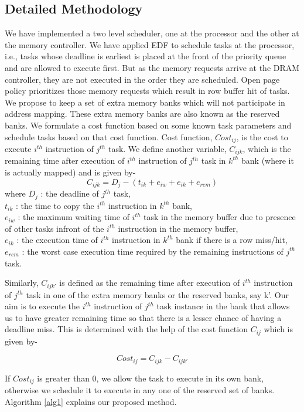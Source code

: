 \subsection{Detailed Methodology}
\noindent
We have implemented a two level scheduler, one at the processor and the other at the memory controller. We have applied EDF to 
schedule tasks at the processor, i.e., tasks whose deadline is earliest is placed at the front of the priority queue and are 
allowed to execute first. But as the memory requests arrive at the DRAM controller, they are not executed in the order 
they are scheduled. Open page policy prioritizes those memory requests which result in row buffer hit of tasks. We propose 
to keep a set of extra memory banks which will not participate in address mapping. These extra memory banks are also known as
the reserved banks. We formulate a cost function based on some
known task parameters and schedule tasks based on that cost function. Cost function, $Cost_{ij}$, is the cost to execute 
$i^{th}$ instruction of $j^{th}$ task. We define another variable, $C_{ijk}$, which is the remaining time after execution
of $i^{th}$ instruction of $j^{th}$ task in $k^{th}$ bank (where it is actually mapped) and is given by-
\[C_{ijk} = D_{j} - (t_{ik} + e_{iw} + e_{ik} + e_{rem})\]\label{eq1}
where $D_{j}$ : the deadline of $j^{th}$ task,\\
$t_{ik}$ : the time to copy the $i^{th}$ instruction in $k^{th}$ bank,\\
$e_{iw}$ : the maximum waiting time of $i^{th}$ task in the memory buffer due to presence of other tasks infront of the 
$i^{th}$ instruction in the memory buffer,\\
$e_{ik}$ : the execution time of $i^{th}$ instruction in $k^{th}$ bank if there is a row miss/hit,\\
$e_{rem}$ : the worst case execution time required by the remaining instructions of $j^{th}$ task.

Similarly, $C_{ijk'}$ is defined as the remaining time after execution of $i^{th}$ instruction of $j^{th}$ task in one of the 
extra memory banks or the reserved banks, say k'. Our aim is to execute the $i^{th}$ instruction of $j^{th}$ task instance in the bank that allows us to 
have greater remaining time so that there is a lesser chance of having a deadline miss. This is determined with the help of the 
cost function $C_{ij}$ which is given by-

\[Cost_{ij} = C_{ijk} - C_{ijk'}\]

If $Cost_{ij}$ is greater than 0, we allow the task to execute in its own bank, otherwise we schedule it to execute in any one 
of the reserved set of banks. Algorithm \ref{alg1} explains our proposed method.

